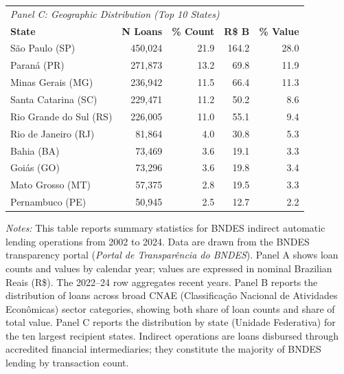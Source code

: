 \documentclass{article}
\begin{document}
\begin{table}[H]
\begin{threeparttable}
        \vspace{0.5em}

        \begin{tabular}{lrrrr}
            \toprule
            \multicolumn{5}{l}{\textit{Panel C: Geographic Distribution (Top 10 States)}}                      \\
            \textbf{State}         & \textbf{N Loans} & \textbf{\% Count} & \textbf{R\$ B} & \textbf{\% Value} \\
            \midrule
            S\~ao Paulo (SP)       & 450,024          & 21.9              & 164.2          & 28.0              \\
            Paran\'a (PR)          & 271,873          & 13.2              & 69.8           & 11.9              \\
            Minas Gerais (MG)      & 236,942          & 11.5              & 66.4           & 11.3              \\
            Santa Catarina (SC)    & 229,471          & 11.2              & 50.2           & 8.6               \\
            Rio Grande do Sul (RS) & 226,005          & 11.0              & 55.1           & 9.4               \\
            Rio de Janeiro (RJ)    & 81,864           & 4.0               & 30.8           & 5.3               \\
            Bahia (BA)             & 73,469           & 3.6               & 19.1           & 3.3               \\
            Goi\'as (GO)           & 73,296           & 3.6               & 19.8           & 3.4               \\
            Mato Grosso (MT)       & 57,375           & 2.8               & 19.5           & 3.3               \\
            Pernambuco (PE)        & 50,945           & 2.5               & 12.7           & 2.2               \\
            \bottomrule
        \end{tabular}
        \begin{tablenotes}
            \small
            \item \textit{Notes:} This table reports summary statistics for BNDES indirect automatic lending operations from 2002 to 2024. Data are drawn from the BNDES transparency portal (\textit{Portal de Transpar\^encia do BNDES}). Panel A shows loan counts and values by calendar year; values are expressed in nominal Brazilian Reais (R\$). The 2022--24 row aggregates recent years. Panel B reports the distribution of loans across broad CNAE (Classifica\c{c}\~ao Nacional de Atividades Econ\^omicas) sector categories, showing both share of loan counts and share of total value. Panel C reports the distribution by state (Unidade Federativa) for the ten largest recipient states. Indirect operations are loans disbursed through accredited financial intermediaries; they constitute the majority of BNDES lending by transaction count.
        \end{tablenotes}
    \end{threeparttable}
\end{table}
\end{document}
